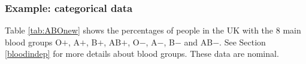 \documentclass[
  british,
  11pt,
  openany, a4paper]{book}
\begin{document}
\subsubsection*{Example: categorical data}\label{example-categorical-data}

Table \ref{tab:ABOnew} shows the percentages of people in the UK with the 8 main blood groups O\(+\), A\(+\), B\(+\), AB\(+\), O\(-\), A\(-\), B\(-\) and AB\(-\). See Section \ref{bloodindep} for more details about blood groups. These data are nominal.

 
  \providecommand{\huxb}[2]{\arrayrulecolor[RGB]{#1}\global\arrayrulewidth=#2pt}
  \providecommand{\huxvb}[2]{\color[RGB]{#1}\vrule width #2pt}
  \providecommand{\huxtpad}[1]{\rule{0pt}{#1}}
  \providecommand{\huxbpad}[1]{\rule[-#1]{0pt}{#1}}
\end{document}
